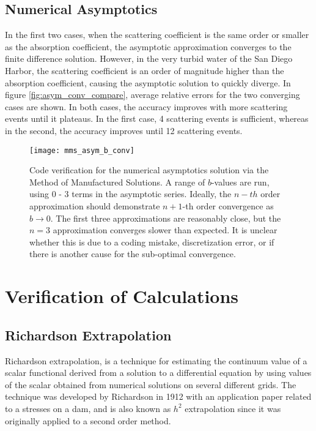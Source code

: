 \subsection{Numerical Asymptotics}

In the first two cases, when the scattering coefficient is the same order or smaller as the absorption coefficient,
the asymptotic approximation converges to the finite difference solution.
However, in the very turbid water of the San Diego Harbor, the scattering coefficient is an order of magnitude higher
than the absorption coefficient, causing the asymptotic solution to quickly diverge.
In figure \ref{fig:asym_conv_compare}, average relative errors for the two converging cases are shown.
In both cases, the accuracy improves with more scattering events until it plateaus.
In the first case, 4 scattering events is sufficient, whereas in the second, the accuracy improves until 12 scattering events.

\begin{figure}[H]
  \centering
  \texttt{[image: mms\_asym\_b\_conv]}
  \caption{Code verification for the numerical asymptotics solution via the Method of Manufactured Solutions. A range of $b$-values are run, using 0 - 3 terms in the asymptotic series. Ideally, the $n-th$ order approximation should demonstrate $n+1$-th order convergence as $b \to 0$. The first three approximations are reasonably close, but the $n=3$ approximation converges slower than expected. It is unclear whether this is due to a coding mistake, discretization error, or if there is another cause for the sub-optimal convergence.}
  \label{fig:mms_asym_b_conv}
\end{figure}

\section{Verification of Calculations}
\subsection{Richardson Extrapolation}
Richardson extrapolation, is a technique for estimating the continuum value of a scalar functional derived from a solution to a differential equation by using values of the scalar obtained from numerical solutions on several different grids.
The technique was developed by Richardson in 1912 with an application paper related to a stresses on a dam, and is also known as $h^2$ extrapolation since it was originally applied to a second order method.

